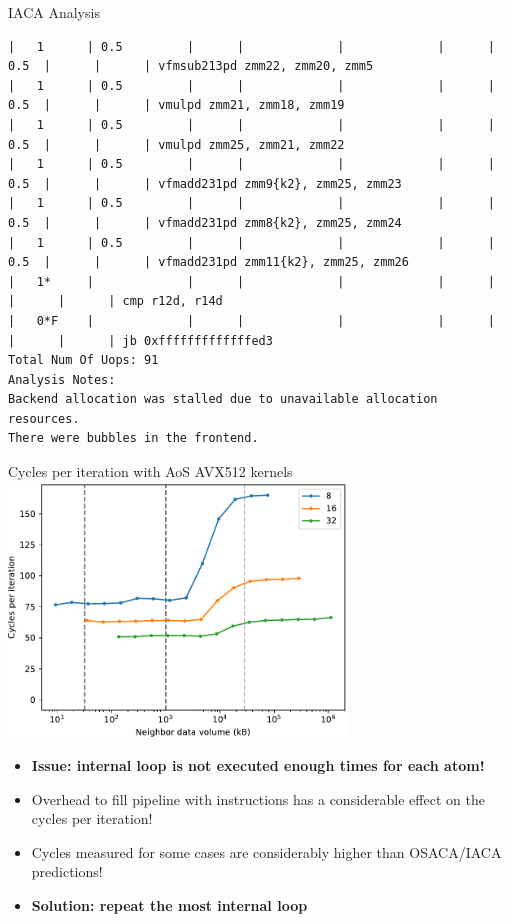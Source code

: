 \documentclass[aspectratio=169,t]{beamer}
\begin{document}
  \begin{frame}[fragile]{IACA Analysis}
    \vspace{-20pt}
    \begin{lstlisting}[basicstyle=\tt\fontsize{4pt}{6pt}\selectfont]
|   1      | 0.5         |      |             |             |      | 0.5  |      |      | vfmsub213pd zmm22, zmm20, zmm5
|   1      | 0.5         |      |             |             |      | 0.5  |      |      | vmulpd zmm21, zmm18, zmm19
|   1      | 0.5         |      |             |             |      | 0.5  |      |      | vmulpd zmm25, zmm21, zmm22
|   1      | 0.5         |      |             |             |      | 0.5  |      |      | vfmadd231pd zmm9{k2}, zmm25, zmm23
|   1      | 0.5         |      |             |             |      | 0.5  |      |      | vfmadd231pd zmm8{k2}, zmm25, zmm24
|   1      | 0.5         |      |             |             |      | 0.5  |      |      | vfmadd231pd zmm11{k2}, zmm25, zmm26
|   1*     |             |      |             |             |      |      |      |      | cmp r12d, r14d
|   0*F    |             |      |             |             |      |      |      |      | jb 0xfffffffffffffed3
Total Num Of Uops: 91
Analysis Notes:
Backend allocation was stalled due to unavailable allocation resources.
There were bubbles in the frontend.
    \end{lstlisting}
  \end{frame}

  \begin{frame}[fragile]{Cycles per iteration with AoS AVX512 kernels}
    \includegraphics[width=9cm]{results_aos_casclakesp2_neighbor_vol.pdf}
  \end{frame}

  \begin{frame}[fragile]{}
    \begin{itemize}
      \item \textbf{Issue: internal loop is not executed enough times for each atom!}
      \item Overhead to fill pipeline with instructions has a considerable effect on the cycles per iteration!
      \item Cycles measured for some cases are considerably higher than OSACA/IACA predictions!
      \item \textbf{Solution: repeat the most internal loop}
    \end{itemize}
  \end{frame}
\end{document}
